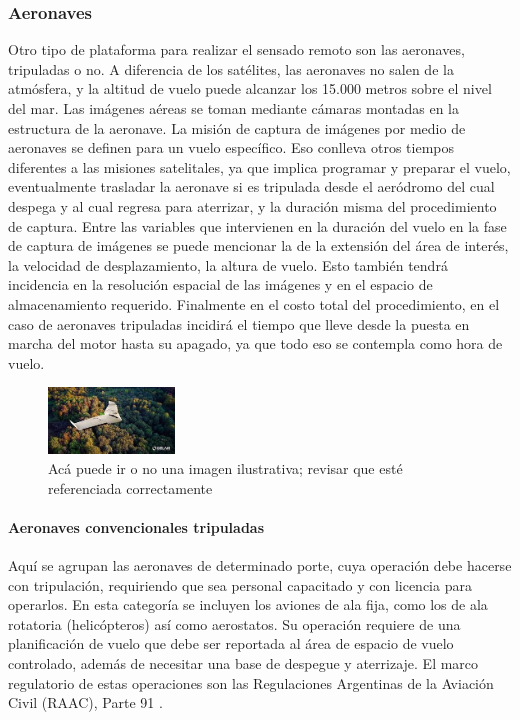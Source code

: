 \subsubsection{Aeronaves}
Otro tipo de plataforma para realizar el sensado remoto son las aeronaves, tripuladas o no. A diferencia de los satélites, las aeronaves no salen de la atmósfera, y la altitud de vuelo puede alcanzar los 15.000 metros sobre el nivel del mar. Las imágenes aéreas se toman mediante cámaras montadas en la estructura de la aeronave. La misión de captura de imágenes por medio de aeronaves se definen para un vuelo específico. Eso conlleva otros tiempos diferentes a las misiones satelitales, ya que implica programar y preparar el vuelo, eventualmente trasladar la aeronave si es tripulada desde el aeródromo del cual despega y al cual regresa para aterrizar, y la duración misma del procedimiento de captura. Entre las variables que intervienen en la duración del vuelo en la fase de captura de imágenes se puede mencionar la de la extensión del área de interés, la velocidad de desplazamiento, la altura de vuelo. Esto también tendrá incidencia en la resolución espacial de las imágenes y en el espacio de almacenamiento requerido. Finalmente en el costo total del procedimiento, en el caso de aeronaves tripuladas incidirá el tiempo que lleve desde la puesta en marcha del motor hasta su apagado, ya que todo eso se contempla como hora de vuelo.

\begin{figure}
    \includegraphics[width=0.3\textwidth]{Imagenes/dron.jpg}
     \hfill
     \caption{Acá puede ir o no una imagen ilustrativa; revisar que esté referenciada correctamente}
    \label{dron}
\end{figure}
\paragraph{Aeronaves convencionales tripuladas}
Aquí se agrupan las aeronaves de determinado porte, cuya operación debe hacerse con tripulación, requiriendo que sea personal capacitado y con licencia para operarlos. En esta categoría se incluyen los aviones de ala fija, como los de ala rotatoria (helicópteros) así como aerostatos. Su operación requiere de una planificación de vuelo que debe ser reportada al área de espacio de vuelo controlado, además de necesitar una base de despegue y aterrizaje. El marco regulatorio de estas operaciones son las Regulaciones Argentinas de la Aviación Civil (RAAC), Parte 91 \cite{noauthor_infoleg_nodate-1}.


